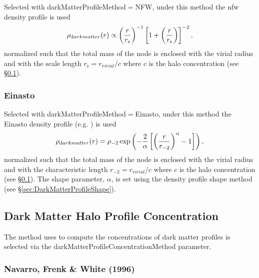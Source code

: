 Selected with {\normalfont \ttfamily darkMatterProfileMethod}$=${\normalfont \ttfamily NFW}, under this method the \gls{nfw} density profile \citep{navarro_universal_1997} is used
\begin{equation}
  \rho_{\mathrm dark matter}(r) \propto \left({r\over r_{\mathrm s}}\right)^{-1} \left[1 + \left({r\over r_{\mathrm s}}\right) \right]^{-2},
\end{equation}
normalized such that the total mass of the \gls{node} is enclosed with the virial radius and with the scale length $r_{\mathrm s} = r_{\mathrm virial}/c$ where $c$ is the halo concentration (see \S\ref{sec:DarkMatterProfileConcentration}).

\subsubsection{Einasto}

Selected with {\normalfont \ttfamily darkMatterProfileMethod}$=${\normalfont \ttfamily Einasto}, under this method the Einasto density profile (e.g. \citealt{cardone_spherical_2005}) is used
\begin{equation}
  \rho_{\mathrm dark matter}(r) = \rho_{-2} \exp \left( - {2 \over \alpha} \left[ \left( {r \over r_{-2}} \right)^\alpha - 1 \right] \right),
\end{equation}
normalized such that the total mass of the \gls{node} is enclosed with the virial radius and with the characteristic length $r_{-2} = r_{\mathrm virial}/c$ where $c$ is the halo concentration (see \S\ref{sec:DarkMatterProfileConcentration}). The shape parameter, $\alpha$, is set using the density profile shape method (see \S\ref{sec:DarkMatterProfileShape}).

\subsection{Dark Matter Halo Profile Concentration}\label{sec:DarkMatterProfileConcentration}

The method uses to compute the concentrations of dark matter profiles is selected via the {\normalfont \ttfamily darkMatterProfileConcentrationMethod} parameter.

\subsubsection{Navarro, Frenk \& White (1996)}\label{phys:darkMatterProfileConcentration:darkMatterProfileConcentrationNFW1996}

